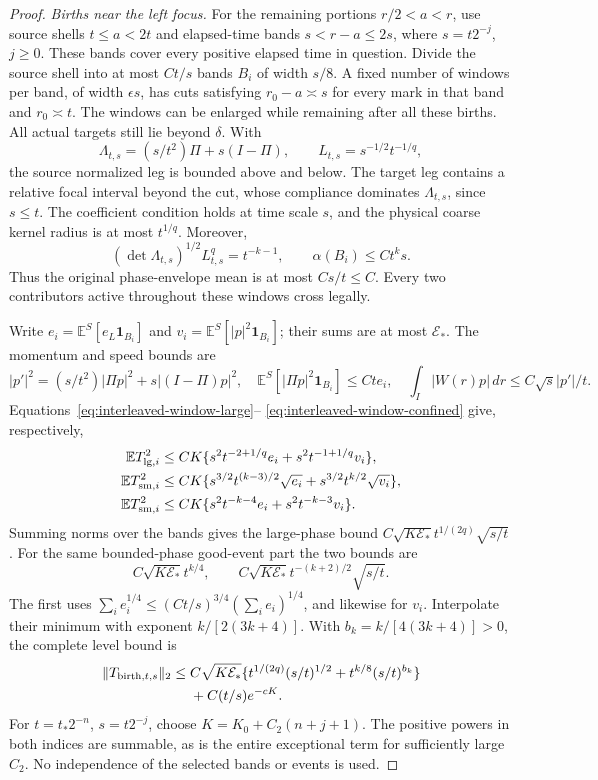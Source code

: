 \documentclass[11pt,reqno]{amsart}
\theoremstyle{definition}
\theoremstyle{remark}
\numberwithin{equation}{section}
\newcommand{\E}{\mathbb E}
\begin{document}
\begin{proof}
\emph{Births near the left focus.}
For the remaining portions \(r/2<a<r\), use source shells
\(t\le a<2t\) and elapsed-time bands \(s<r-a\le2s\), where
\(s=t2^{-j}\), \(j\ge0\). These bands cover every positive
elapsed time in question. Divide the source shell into at most
\(Ct/s\) bands \(B_i\) of width \(s/8\). A fixed number of
windows per band, of width \(\epsilon s\), has cuts satisfying
\(r_0-a\asymp s\) for every mark in that band and \(r_0\asymp t\).
The windows can be enlarged while remaining after all these births.
All actual targets still lie beyond \(\delta\). With
\[
 \Lambda_{t,s}=(s/t^2)\Pi+s(I-\Pi),\qquad
 L_{t,s}=s^{-1/2}t^{-1/q},
\]
the source normalized leg is bounded above and below. The target
leg contains a relative focal interval beyond the cut, whose
compliance dominates \(\Lambda_{t,s}\), since \(s\le t\).
The coefficient condition holds at time scale \(s\), and the
physical coarse kernel radius is at most \(t^{1/q}\). Moreover,
\[
 (\det\Lambda_{t,s})^{1/2}L_{t,s}^q=t^{-k-1},
 \qquad \alpha(B_i)\le Ct^k s.
\]
Thus the original phase-envelope mean is at most \(Cs/t\le C\).
Every two contributors active throughout these windows cross legally.

Write \(e_i=\E^S[e_L\mathbf1_{B_i}]\) and
\(v_i=\E^S[|p|^2\mathbf1_{B_i}]\); their sums are at most
\(\mathcal E_*\). The momentum and speed bounds are
\[
 |p'|^2=(s/t^2)|\Pi p|^2+s|(I-\Pi)p|^2,
 \quad \E^S[|\Pi p|^2\mathbf1_{B_i}]\le Ct e_i,
 \quad \int_I|W(r)p|\,dr\le C\sqrt{s}|p'|/t.
\]
Equations~\eqref{eq:interleaved-window-large}--
\eqref{eq:interleaved-window-confined} give, respectively,
\[
 \begin{split}
 \E T_{{\rm lg},i}^2
 &\le CK\{s^2t^{-2+1/q}e_i+s^2t^{-1+1/q}v_i\},\\
 \E T_{{\rm sm},i}^2
 &\le CK\{s^{3/2}t^{(k-3)/2}\sqrt{e_i}
                         +s^{3/2}t^{k/2}\sqrt{v_i}\},\\
 \E T_{{\rm sm},i}^2
 &\le CK\{s^2t^{-k-4}e_i+s^2t^{-k-3}v_i\}.
 \end{split}
\]
Summing norms over the bands gives the large-phase bound
\(C\sqrt{K\mathcal E_*}t^{1/(2q)}\sqrt{s/t}\).
For the same bounded-phase good-event part the two bounds are
\[
 C\sqrt{K\mathcal E_*}t^{k/4},\qquad
 C\sqrt{K\mathcal E_*}t^{-(k+2)/2}\sqrt{s/t}.
\]
The first uses \(\sum_i e_i^{1/4}\le
(Ct/s)^{3/4}(\sum_i e_i)^{1/4}\), and likewise for \(v_i\).
Interpolate their minimum with exponent \(k/[2(3k+4)]\).
With \(b_k=k/[4(3k+4)]>0\), the complete level bound is
\begin{equation}
\label{eq:interleaved-birth-sum}
 \begin{split}
 \|T_{{\rm birth},t,s}\|_2
 \le{}&C\sqrt{K\mathcal E_*}
       \{t^{1/(2q)}(s/t)^{1/2}+t^{k/8}(s/t)^{b_k}\}\\
      &+C(t/s)e^{-cK}.
 \end{split}
\end{equation}
For \(t=t_*2^{-n}\), \(s=t2^{-j}\), choose
\(K=K_0+C_2(n+j+1)\). The positive powers in both indices are
summable, as is the entire exceptional term for sufficiently large
\(C_2\). No independence of the selected bands or events is used.


\end{proof}
\end{document}
